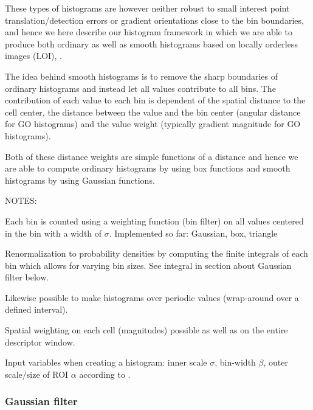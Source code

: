 \documentclass[thesis.tex]{subfiles}
\begin{document}
These types of histograms are however neither robust to small interest point translation/detection errors or gradient orientations close to the bin boundaries, and hence we here describe our histogram framework in which we are able to produce both ordinary as well as smooth histograms based on locally orderless images (LOI), \cite{koenderink1999structure}.

The idea behind smooth histograms is to remove the sharp boundaries of ordinary histograms and instead let all values contribute to all bins. The contribution of each value to each bin is dependent of the spatial distance to the cell center, the distance between the value and the bin center (angular distance for GO histograms) and the value weight (typically gradient magnitude for GO histograms).

Both of these distance weights are simple functions of a distance and hence we are able to compute ordinary histograms by using box functions and smooth histograms by using Gaussian functions.

NOTES:

Each bin is counted using a weighting function (bin filter) on all values centered in the bin with a width of $\sigma$.
Implemented so far: Gaussian, box, triangle

Renormalization to probability densities by computing the finite integrals of each bin which allows for varying bin sizes. See integral in section about Gaussian filter below.

Likewise possible to make histograms over periodic values (wrap-around over a defined interval).

Spatial weighting on each cell (magnitudes) possible as well as on the entire descriptor window.

Input variables when creating a histogram: inner scale $\sigma$, bin-width $\beta$, outer scale/size of ROI $\alpha$ according to \citet{koenderink1999structure}.



\subsubsection{Gaussian filter}
\end{document}
